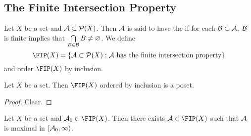 \documentclass{book}
\begin{document}
	
	
	
	
	
	
	
	
	
	
	
	
	
	
	
	
		

	






















	\subsection{The Finite Intersection Property} 
	
	\begin{defn} 
		Let $X$ be a set and $\mathcal{A} \subset \mathcal{P}(X)$. Then $\mathcal{A}$ is said to have the  if for each $\mathcal{B} \subset \mathcal{A}$, $\mathcal{B}$ is finite implies that $\bigcap\limits_{B \in \mathcal{B}} B \neq \varnothing$. We define 
		$$\FIP(X) = \{\MA \subset \MP(X): \MA \text{ has the finite intersection property} \}$$ 
		and order $\FIP(X)$ by inclusion. 
	\end{defn}

	\begin{ex} 
		Let $X$ be a set. Then $\FIP(X)$ ordered by inclusion is a poset.
	\end{ex}

	\begin{proof}
		Clear.
	\end{proof}

	\begin{ex} 
		Let $X$ be a set and $\MA_0 \in \FIP(X)$. Then there exists $\MA \in \FIP(X)$ such that $\mathcal{A}$ is maximal in $[\mathcal{A}_0, \infty)$. 
	\end{ex}
\end{document}
